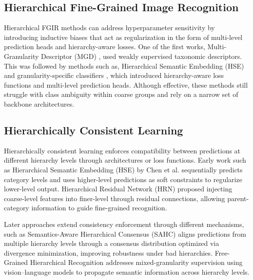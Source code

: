 \documentclass[10pt,twocolumn,letterpaper]{article}
\begin{document}
\subsection{Hierarchical Fine-Grained Image Recognition}
Hierarchical FGIR methods can address hyperparameter sensitivity by introducing inductive biases that act as regularization in the form of multi-level prediction heads and hierarchy-aware losses. One of the first works, Multi-Granularity Descriptor (MGD) \cite{wang_multiple_2015}, used weakly supervised taxonomic descriptors. This was followed by methods such as, Hierarchical Semantic Embedding (HSE) \cite{chen_fine-grained_2018} and granularity-specific classifiers \cite{chang_your_2021}, which introduced hierarchy-aware loss functions and multi-level prediction heads. Although effective, these methods still struggle with class ambiguity within coarse groups and rely on a narrow set of backbone architectures.

\subsection{Hierarchically Consistent Learning}
Hierarchically consistent learning enforces compatibility between predictions at different hierarchy levels through architectures or loss functions. Early work such as Hierarchical Semantic Embedding (HSE) by Chen et al. \cite{chen_fine-grained_2018} sequentially predicts category levels and uses higher-level predictions as soft constraints to regularize lower-level output. Hierarchical Residual Network (HRN) \cite{chen_label_2022} proposed injecting coarse-level features into finer-level through residual connections, allowing parent-category information to guide fine-grained recognition. 

Later approaches extend consistency enforcement through different mechanisms, such as Semantics-Aware Hierarchical Consensus (SAHC) \cite{weikmann_semantics-aware_2025} aligns predictions from multiple hierarchy levels through a consensus distribution optimized via divergence minimization, improving robustness under bad hierarchies. Free-Grained Hierarchical Recognition \cite{park_free-grained_2025} addresses mixed-granularity supervision using vision–language models to propagate semantic information across hierarchy levels. 
\end{document}
